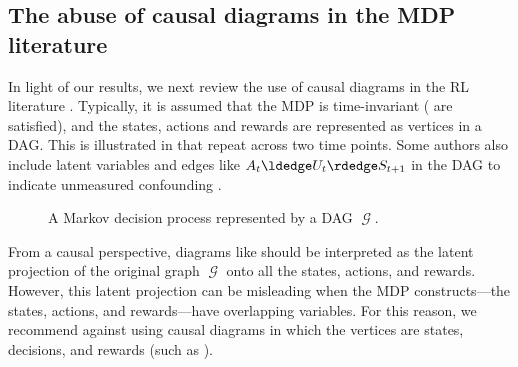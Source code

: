 \documentclass[12pt,a4paper]{article}
\theoremstyle{definition}
\DeclareMathOperator{\gG}{\mathscr{G}}
\begin{document}
\subsection{The abuse of causal diagrams in the MDP literature}
In light of our results, we next review the use of causal diagrams
in the RL literature \parencite[see
e.g.][]{kallus2020double}. Typically, it is assumed that the MDP is
time-invariant
( are
satisfied), and
the states, actions and rewards are represented as vertices in a
DAG. This is illustrated in  that repeat
across two time points. Some authors also include
latent variables and edges like $A_t \ldedge U_t \rdedge S_{t+1}$ in
the DAG to indicate unmeasured confounding
\parencite{xu2023instrumentalvariableapproachconfounded}.
\begin{figure}[t]
  \begin{subfigure}[b]{\textwidth}
      \centering
  \end{subfigure}
  \caption{A Markov decision process represented by a DAG $\gG$.}

  \label{fig:rl_causal_diagram}
\end{figure}

From a causal perspective, diagrams like 
should be interpreted as the latent projection of the original graph
$\gG$ \parencite{verma_pearl_1990} onto all the states, actions, and
rewards. However, this latent projection can be misleading when the
MDP constructs---the states, actions, and rewards---have overlapping
variables. For this reason, we
recommend against using causal diagrams in which the vertices are states,
decisions, and rewards (such as
).
\end{document}
